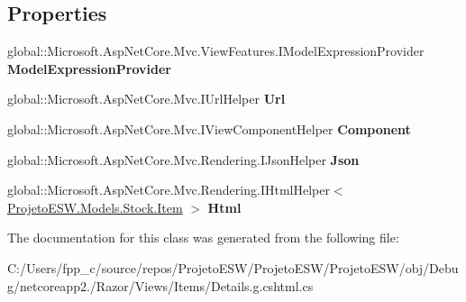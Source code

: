 \subsection*{Properties}
\begin{DoxyCompactItemize}
\item 
\mbox{\label{class_asp_net_core_1_1_views___items___details_af9ba913079973308ba5452d7d374ea39}} 
global\+::\+Microsoft.\+Asp\+Net\+Core.\+Mvc.\+View\+Features.\+I\+Model\+Expression\+Provider {\bfseries Model\+Expression\+Provider}
\item 
\mbox{\label{class_asp_net_core_1_1_views___items___details_a55a4bb9f93ff3aff2158a182146d4aaa}} 
global\+::\+Microsoft.\+Asp\+Net\+Core.\+Mvc.\+I\+Url\+Helper {\bfseries Url}
\item 
\mbox{\label{class_asp_net_core_1_1_views___items___details_ae6dc781d4fabcd83e0808a1f073e97aa}} 
global\+::\+Microsoft.\+Asp\+Net\+Core.\+Mvc.\+I\+View\+Component\+Helper {\bfseries Component}
\item 
\mbox{\label{class_asp_net_core_1_1_views___items___details_a0fcec690e96d41c271aca75bb76ce708}} 
global\+::\+Microsoft.\+Asp\+Net\+Core.\+Mvc.\+Rendering.\+I\+Json\+Helper {\bfseries Json}
\item 
\mbox{\label{class_asp_net_core_1_1_views___items___details_a81edda82829ff371df08adb104de1982}} 
global\+::\+Microsoft.\+Asp\+Net\+Core.\+Mvc.\+Rendering.\+I\+Html\+Helper$<$ \mbox{\hyperlink{class_projeto_e_s_w_1_1_models_1_1_stock_1_1_item}{Projeto\+E\+S\+W.\+Models.\+Stock.\+Item}} $>$ {\bfseries Html}
\end{DoxyCompactItemize}


The documentation for this class was generated from the following file\+:\begin{DoxyCompactItemize}
\item 
C\+:/\+Users/fpp\+\_\+c/source/repos/\+Projeto\+E\+S\+W/\+Projeto\+E\+S\+W/\+Projeto\+E\+S\+W/obj/\+Debug/netcoreapp2./\+Razor/\+Views/\+Items/Details.\+g.\+cshtml.\+cs\end{DoxyCompactItemize}
